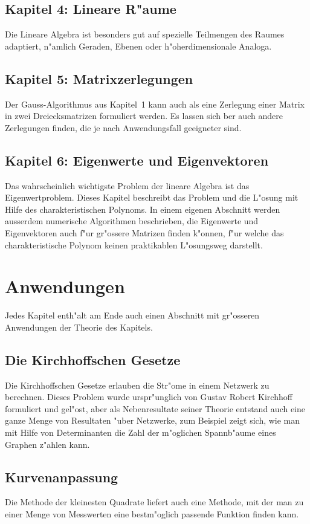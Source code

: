 \subsection*{Kapitel 4: Lineare R"aume}
Die Lineare Algebra ist besonders gut auf spezielle
Teilmengen des Raumes adaptiert, n"amlich Geraden,
Ebenen oder h"oherdimensionale Analoga.

\subsection*{Kapitel 5: Matrixzerlegungen}
Der Gauss-Algorithmus aus Kapitel~1 kann auch als eine
Zerlegung einer Matrix in zwei Dreiecksmatrizen formuliert werden.
Es lassen sich ber auch andere Zerlegungen finden, die je
nach Anwendungsfall geeigneter sind.

\subsection*{Kapitel 6: Eigenwerte und Eigenvektoren}
Das wahrscheinlich wichtigste Problem der lineare Algebra
ist das Eigenwertproblem.
Dieses Kapitel beschreibt das Problem und die L"osung mit Hilfe
des charakteristischen Polynoms.
In einem eigenen Abschnitt werden ausserdem numerische Algorithmen
beschrieben, die Eigenwerte und Eigenvektoren auch f"ur gr"ossere
Matrizen finden k"onnen, f"ur welche das charakteristische 
Polynom keinen praktikablen L"osungsweg darstellt.

\section*{Anwendungen}
Jedes Kapitel enth"alt am Ende auch einen Abschnitt mit gr"osseren
Anwendungen der Theorie des Kapitels.

\subsection*{Die Kirchhoffschen Gesetze}
Die Kirchhoffschen Gesetze erlauben die Str"ome in einem Netzwerk
zu berechnen.
Dieses Problem wurde urspr"unglich von Gustav Robert Kirchhoff
formuliert und gel"ost, aber als Nebenresultate seiner Theorie
entstand auch eine ganze Menge von Resultaten "uber Netzwerke,
zum Beispiel zeigt sich, wie man mit Hilfe von Determinanten
die Zahl der m"oglichen Spannb"aume eines Graphen z"ahlen kann.

\subsection*{Kurvenanpassung}
Die Methode der kleinesten Quadrate liefert auch eine Methode,
mit der man zu einer Menge von Messwerten eine bestm"oglich passende
Funktion finden kann.

